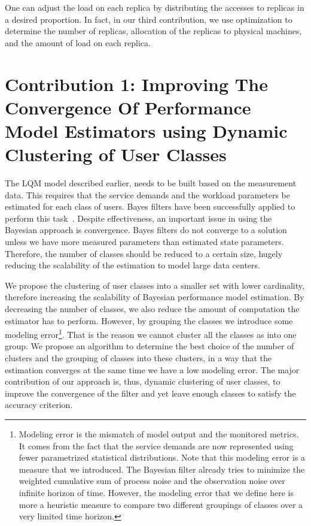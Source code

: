 \documentclass[11pt]{article}
\begin{document}
 One can adjust the load on each replica by distributing the accesses to replicas in a desired proportion.
In fact, in our third contribution, we use optimization to determine the number of replicas, allocation of the replicas to physical machines, and the amount of load on each replica. 

 \section{Contribution 1: Improving The Convergence Of Performance Model Estimators using Dynamic Clustering of User Classes} 
\label{models_in_a_state_estimation} 
 The LQM model described earlier, needs to be built based on the measurement data. This requires that the service demands and the workload parameters be estimated for each class of users.
 Bayes filters have been successfully applied to perform this task~\cite{woodside_use_2005,xu_performance_2005,zheng_tracking_2005}.
Despite effectiveness, an important issue in using the Bayesian approach is convergence.
 Bayes filters do not converge to a solution unless we have more measured parameters than estimated state parameters. Therefore, the number of classes should be reduced to a certain size, hugely reducing the scalability of the estimation to model large data centers.

We propose the clustering of user classes into a smaller set with lower cardinality, therefore increasing the scalability of Bayesian performance model estimation. 
By decreasing the number of classes, we also reduce the amount of computation the estimator has to perform.
However, by grouping the classes we introduce some modeling error\footnote{Modeling error is the mismatch of model output and the monitored metrics.
It comes from the fact that the service demands are now represented using fewer parametrized statistical distributions. Note that this modeling error is a measure that we introduced. The Bayesian filter already tries to minimize the weighted cumulative sum of process noise and the observation noise over infinite horizon of time. However, the modeling error that we define here is more a heuristic measure to compare two different groupings of classes over a very limited time horizon. }.
That is the reason we cannot cluster all the classes as into one group. We propose an algorithm to determine the best choice of the number of clusters and the grouping of classes into these clusters, in a way that the estimation converges at the same time we have a low modeling error. The major contribution of our approach is, thus, dynamic clustering of user classes, to improve the convergence of the filter and yet leave enough classes to satisfy the accuracy criterion.  
\end{document}
